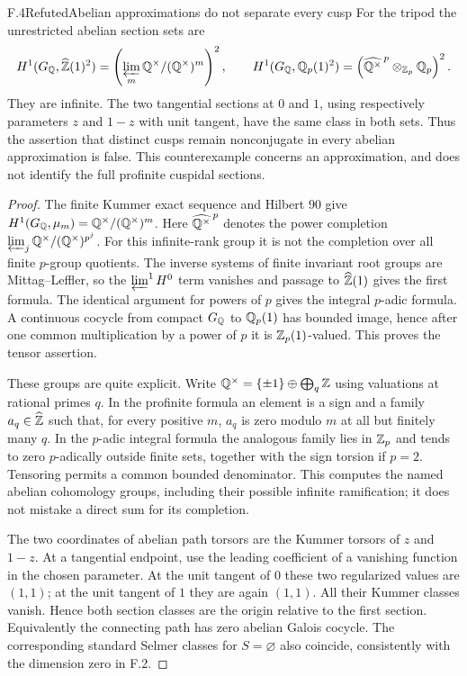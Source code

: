\begin{statement}{F.4}{Refuted}{Abelian approximations do not separate every cusp}
For the tripod the unrestricted abelian section sets are
\[
 H^1(G_\mathbb Q,\widehat{\mathbb Z}(1)^2)
       =\left(\varprojlim_m\mathbb Q^\times/(\mathbb Q^\times)^m\right)^2,
 \qquad
 H^1(G_\mathbb Q,\mathbb Q_p(1)^2)
       =\left(\widehat{\mathbb Q^\times}^{\,p}\otimes_{\mathbb Z_p}\mathbb Q_p\right)^2.
\]
They are infinite. The two tangential sections at $0$ and $1$,
using respectively parameters $z$ and $1-z$ with unit tangent,
have the same class in both sets. Thus the assertion that
distinct cusps remain nonconjugate in every abelian
approximation is false. This counterexample concerns an
approximation, and does not identify the full profinite
cuspidal sections.
\end{statement}
\begin{proof}
The finite Kummer exact sequence and Hilbert 90 give
$H^1(G_\mathbb Q,\mu_m)=\mathbb Q^\times/(\mathbb Q^\times)^m$.
Here $\widehat{\mathbb Q^\times}^{\,p}$ denotes the power
completion $\varprojlim_j\mathbb Q^\times/(\mathbb Q^\times)^{p^j}$.
For this infinite-rank group it is not the completion
over all finite $p$-group quotients.
The inverse systems of finite invariant root groups
are Mittag--Leffler, so the $\varprojlim^1 H^0$ term
vanishes and passage to $\widehat{\mathbb Z}(1)$ gives the first
formula. The identical argument for powers of $p$ gives
the integral $p$-adic formula. A continuous cocycle from
compact $G_\mathbb Q$ to $\mathbb Q_p(1)$ has bounded image, hence after
one common multiplication by a power of $p$ it is
$\mathbb Z_p(1)$-valued. This proves the tensor assertion.

These groups are quite explicit. Write
$\mathbb Q^\times=\{\pm1\}\oplus\bigoplus_q\mathbb Z$ using valuations
at rational primes $q$. In the profinite formula an
element is a sign and a family $a_q\in\widehat{\mathbb Z}$ such
that, for every positive $m$, $a_q$ is zero modulo $m$
at all but finitely many $q$. In the $p$-adic integral
formula the analogous family lies in $\mathbb Z_p$ and tends
to zero $p$-adically outside finite sets, together with
the sign torsion if $p=2$. Tensoring permits a common
bounded denominator. This computes the named abelian
cohomology groups, including their possible infinite
ramification; it does not mistake a direct sum for
its completion.

The two coordinates of abelian path torsors are the
Kummer torsors of $z$ and $1-z$. At a tangential
endpoint, use the leading coefficient of a vanishing
function in the chosen parameter. At the unit tangent
of $0$ these two regularized values are $(1,1)$;
at the unit tangent of $1$ they are again $(1,1)$.
All their Kummer classes vanish. Hence both section
classes are the origin relative to the first section.
Equivalently the connecting path has zero abelian
Galois cocycle. The corresponding standard Selmer
classes for $S=\varnothing$ also coincide, consistently
with the dimension zero in F.2.
\end{proof}


